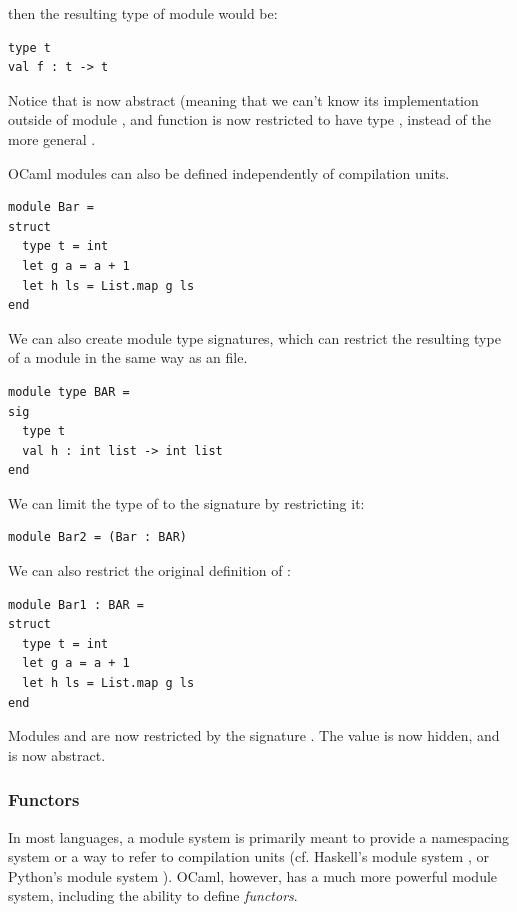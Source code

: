 then the resulting type of module  would be:

\begin{lstlisting}
type t
val f : t -> t
\end{lstlisting}

Notice that  is now abstract (meaning that we can't know
its implementation outside of module , and function 
is now restricted to have type , instead of the more
general .

OCaml modules can also be defined independently of compilation
units.

\begin{lstlisting}
module Bar =
struct
  type t = int
  let g a = a + 1
  let h ls = List.map g ls
end
\end{lstlisting}

We can also create module type signatures, which can restrict the
resulting type of a module in the same way as an  file.

\begin{lstlisting}
module type BAR =
sig
  type t
  val h : int list -> int list
end
\end{lstlisting}

We can limit the type of  to the signature
 by restricting it:

\begin{lstlisting}
module Bar2 = (Bar : BAR)
\end{lstlisting}

We can also restrict the original definition of :

\begin{lstlisting}
module Bar1 : BAR =
struct
  type t = int
  let g a = a + 1
  let h ls = List.map g ls
end
\end{lstlisting}

Modules  and  are now restricted by the
signature . The value  is now hidden, and
 is now abstract.

\subsubsection{Functors}

In most languages, a module system is primarily meant to provide a
namespacing system or a way to refer to compilation units
(cf. Haskell's module system \cite{www:haskell:modules}, or Python's
module system \cite{www:python:modules}). OCaml, however, has a much
more powerful module system, including the ability to define
\textit{functors}.


